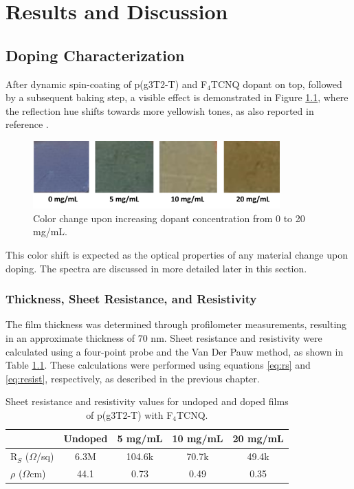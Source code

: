 \chapter{Results and Discussion} \label{cha:3}

\section{Doping Characterization}

After dynamic spin-coating of p(g3T2-T) and F$_{4}$TCNQ dopant on top, followed by a subsequent baking step, a visible effect is demonstrated in Figure \ref{fig:color}, where the reflection hue shifts towards more yellowish tones, as also reported in reference \cite{tanTuningOrganicElectrochemical2022}. 

\begin{figure}[ht]
  \centering
  \includegraphics[width=9.5cm]{Images/pdf/doping_color.pdf}
  \caption[Color shift upon doping level increase]{Color change upon increasing dopant concentration from 0 to 20 mg/mL.
  \label{fig:color}}
\end{figure}

This color shift is expected as the optical properties of any material change upon doping. The spectra are discussed in more detailed later in this section.

\subsection{Thickness, Sheet Resistance, and Resistivity}

The film thickness was determined through profilometer measurements, resulting in an approximate thickness of 70 nm. Sheet resistance and resistivity were calculated using a four-point probe and the Van Der Pauw method, as shown in Table \ref{tab:res}. These calculations were performed using equations \ref{eq:rs} and \ref{eq:resist}, respectively, as described in the previous chapter. 

\begin{table}[ht]
\centering
\caption{Sheet resistance and resistivity values for undoped and doped films of p(g3T2-T) with F$_{4}$TCNQ.}
\begin{tabular}{l|c|c|c|c}
& Undoped & 5 mg/mL & 10 mg/mL & 20 mg/mL \\\hline
R$_{S}$ ($\Omega$/sq) & 6.3M & 104.6k & 70.7k & 49.4k\\
$\rho$ ($\Omega$cm) & 44.1 & 0.73 & 0.49 & 0.35\\\hline
\end{tabular}
\label{tab:res}
\end{table}

